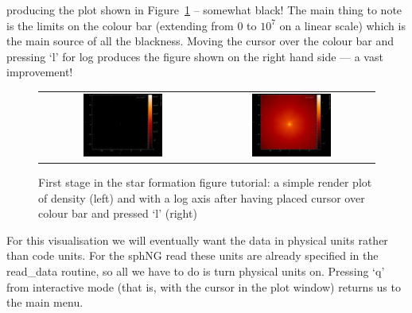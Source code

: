 \documentclass[a4paper,10pt]{article}
\begin{document}
producing the plot shown in Figure~\ref{fig:starpart1} -- somewhat black! The main thing to note is the limits on the colour bar (extending from $0$ to $10^{7}$ on a linear scale) which is the main source of all the blackness. Moving the cursor over the colour bar and pressing `l' for log produces the figure shown on the right hand side --- a vast improvement!
\begin{figure}[h]
\begin{center}
\begin{tabular}{cc}
\includegraphics[width=0.5\textwidth]{starpart1.png} &
\includegraphics[width=0.5\textwidth]{starpart2.png}
\end{tabular}
\caption{First stage in the star formation figure tutorial: a simple render plot of density (left) and with a log axis after having placed cursor over colour bar and pressed `l' (right)}
\label{fig:starpart1}
\end{center}
\end{figure}
For this visualisation we will eventually want the data in physical units rather than code units. For the sphNG read these units are already specified in the read\_data routine, so all we have to do is turn physical units on. Pressing `q' from interactive mode (that is, with the cursor in the plot window) returns us to the main menu.
\end{document}
